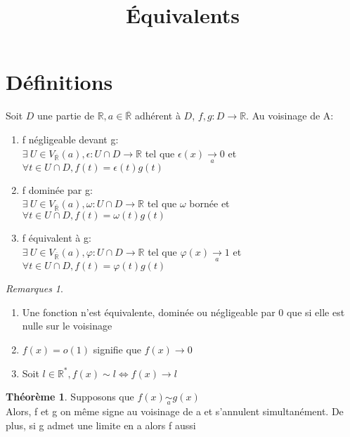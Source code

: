 \documentclass[fleqn]{article}
\title{\'Equivalents}
\date{}
\theoremstyle{definition} \newtheorem*{defi}{D\'efinition}
\theoremstyle{definition} \newtheorem*{theo}{Th\'eor\`eme}
\theoremstyle{remark} \newtheorem*{rqs}{Remarques}
\begin{document}
\maketitle

\section{D\'efinitions}
Soit $D$ une partie de $\mathbb{R}, a \in \overline{\mathbb{R}}$ adh\'erent \`a $D$, $f,g: D \rightarrow \mathbb{R}$. Au voisinage de A:
\begin{enumerate}
	\item f n\'egligeable devant g: \\
		$\exists\ U \in V_{\overline{\mathbb{R}}}(a), \epsilon: U \cap D \rightarrow \mathbb{R}$ tel que
		$\epsilon(x)\underset{a}{\rightarrow}  0$ et $\forall t \in U \cap D, f(t)=\epsilon(t)g(t)$
	\item f domin\'ee par g: \\
		$\exists\ U \in V_{\overline{\mathbb{R}}}(a), \omega: U \cap D \rightarrow \mathbb{R}$ tel que $\omega$ born\'ee et
		$\forall t \in U \cap D, f(t)=\omega(t)g(t)$
	\item f \'equivalent \`a g: \\
		$\exists\ U \in V_{\overline{\mathbb{R}}}(a), \varphi: U \cap D \rightarrow \mathbb{R}$ tel que
		$\varphi(x)\underset{a}{\rightarrow} 1$ et $\forall t \in U \cap D, f(t)=\varphi(t)g(t)$
\end{enumerate}

\begin{rqs} $ $
	\begin{enumerate}
		\item Une fonction n'est \'equivalente, domin\'ee ou n\'egligeable par 0 que si elle est nulle sur le voisinage
		\item $f(x) = o(1)$ signifie que $f(x) \rightarrow 0$
		\item Soit $l \in \mathbb{R}^{*}, f(x) \sim l \Leftrightarrow f(x) \rightarrow l$
	\end{enumerate}
\end{rqs}

\begin{theo}
	Supposons que $f(x)\underset{a}{\sim} g(x)$\\
	Alors, f et g on m\^eme signe au voisinage de a et s'annulent simultan\'ement. De plus, si g admet une limite en a alors f aussi
\end{theo}
\end{document}
